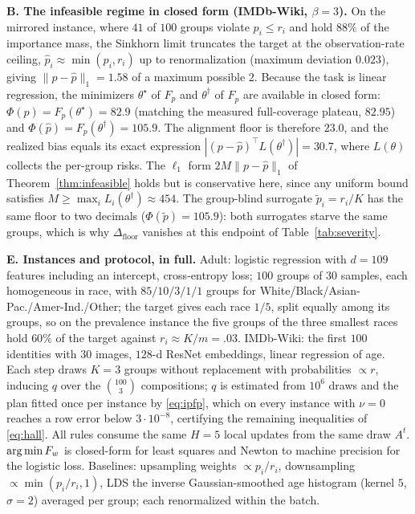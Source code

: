 \medskip
\noindent\textbf{B. The infeasible regime in closed form (IMDb-Wiki, $\beta=3$).}
On the mirrored instance, where $41$ of $100$ groups violate $p_i\le r_i$ and hold
$88\%$ of the importance mass, the Sinkhorn limit truncates the target at the
observation-rate ceiling, $\hat p_i\approx\min(p_i,r_i)$ up to renormalization
(maximum deviation $0.023$), giving $\|p-\hat p\|_1=1.58$ of a maximum possible $2$.
Because the task is linear regression, the minimizers $\theta^\star$ of $F_p$ and
$\theta^\dagger$ of $F_{\hat p}$ are available in closed form:
$\Phi(p)=F_p(\theta^\star)=82.9$ (matching the measured full-coverage plateau, $82.95$)
and $\Phi(\hat p)=F_p(\theta^\dagger)=105.9$. The alignment floor is therefore
$23.0$, and the realized bias equals its exact expression
$|(p-\hat p)^\top L(\theta^\dagger)|=30.7$, where $L(\theta)$ collects the per-group
risks. The $\ell_1$ form $2M\|p-\hat p\|_1$ of Theorem~\ref{thm:infeasible} holds but is
conservative here, since any uniform bound satisfies $M\ge\max_i L_i(\theta^\dagger)\approx 454$.
The group-blind surrogate $\tilde p_i=r_i/K$ has the same floor to two decimals
($\Phi(\tilde p)=105.9$): both surrogates starve the same groups, which is why
$\Delta_{\mathrm{floor}}$ vanishes at this endpoint of Table~\ref{tab:severity}.

\medskip
\noindent\textbf{E. Instances and protocol, in full.}
Adult: logistic regression with $d{=}109$ features including an intercept,
cross-entropy loss; $100$ groups of $30$ samples, each homogeneous in race,
with $85/10/3/1/1$ groups for White/Black/Asian-Pac./Amer-Ind./Other; the
target gives each race $1/5$, split equally among its groups, so on the
prevalence instance the five groups of the three smallest races hold $60\%$
of the target against $r_i\approx K/m=.03$. IMDb-Wiki: the first $100$
identities with $30$ images, $128$-d ResNet embeddings, linear regression of
age. Each step draws $K{=}3$ groups without replacement with
probabilities $\propto r$, inducing $q$ over the $\binom{100}{3}$
compositions; $q$ is estimated from $10^6$ draws and the plan fitted once
per instance by \eqref{eq:ipfp}, which on every instance with $\nu=0$
reaches a row error below $3\cdot10^{-8}$, certifying the remaining
inequalities of \eqref{eq:hall}. All rules consume the same $H{=}5$ local
updates from the same draw $A^t$. $\operatorname*{arg\,min} F_w$ is closed-form for least squares and Newton to
machine precision for the logistic loss. Baselines: upsampling weights
$\propto p_i/r_i$, downsampling $\propto\min(p_i/r_i,1)$, LDS \cite{yang2021dir}
the inverse Gaussian-smoothed age histogram (kernel $5$, $\sigma{=}2$) averaged
per group; each renormalized within the batch.

